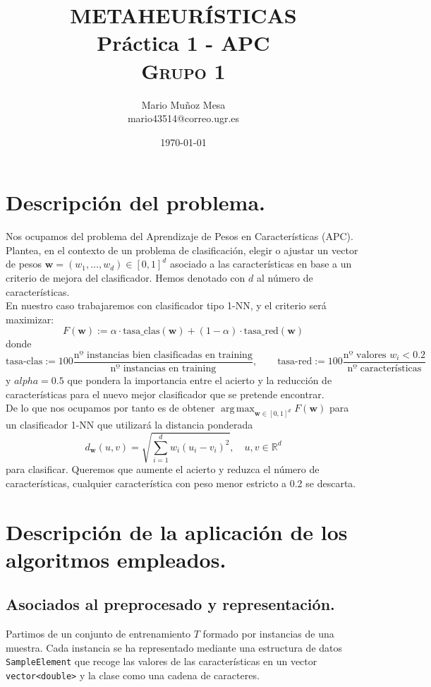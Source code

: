 \documentclass[11pt,a4paper]{article}
\title{
\normalfont \normalsize 
\textsc{\small METAHEURÍSTICAS} \\ [10pt]
	
	
\huge{\textbf{Práctica 1 - APC}}\\

\textsc{\small Grupo 1} \\ [10pt]

	}
\author{Mario Muñoz Mesa\\ mario43514@correo.ugr.es}
\date{\today}
\DeclareMathOperator*{\argmax}{arg\,max}
\theoremstyle{definition}
\newcommand{\R}{\mathbb{R}}
\begin{document}
	\maketitle
	\newpage
	\renewcommand*\contentsname{Índice}	
	\tableofcontents
	
	\newpage
	
	\section{Descripción del problema.}
	Nos ocupamos del problema del Aprendizaje de Pesos en Características (APC). Plantea, en el contexto de un problema de clasificación, elegir o ajustar un vector de pesos $\textbf{w}=(w_1,\ldots, w_d)\in [0,1]^d$ asociado a las características en base a un criterio de mejora del clasificador. Hemos denotado con $d$ al número de características.\\
	
	En nuestro caso trabajaremos con clasificador tipo 1-NN, y el criterio será maximizar:
	$$F(\textbf{w}):=\alpha\cdot \text{tasa\_clas}(\textbf{w})+(1-\alpha ) \cdot \text{tasa\_red}(\textbf{w})$$
	donde
	$$\text{tasa-clas}:=100\frac{\text{nº instancias bien clasificadas en training}}{\text{nº instancias en training}}, \quad \quad \text{tasa-red}:=100\frac{\text{nº valores } w_i <0.2}{\text{nº características}}$$
	y $alpha=0.5$ que pondera la importancia entre el acierto y la reducción de características para el nuevo mejor clasificador que se pretende encontrar.\\
	
	De lo que nos ocupamos por tanto es de obtener $\argmax_{\textbf{w}\in [0,1]^d} F(\textbf{w})$ para un clasificador 1-NN que utilizará la distancia ponderada
	$$d_{\textbf{w}}(u,v)=\sqrt{\sum_{i=1}^d w_i(u_i-v_i)^2}, \quad u,v\in \R^d$$
	para clasificar. Queremos que aumente el acierto y reduzca el número de características, cualquier característica con peso menor estricto a 0.2 se descarta.
	
	
	\newpage
	\section{Descripción de la aplicación de los algoritmos empleados.}
	\subsection{Asociados al preprocesado y representación.}
	Partimos de un conjunto de entrenamiento $T$ formado por instancias de una muestra. Cada instancia se ha representado mediante una estructura de datos \texttt{SampleElement} que recoge las valores de las características en un vector \texttt{vector<double>} y la clase como una cadena de caracteres.
	
\end{document}
